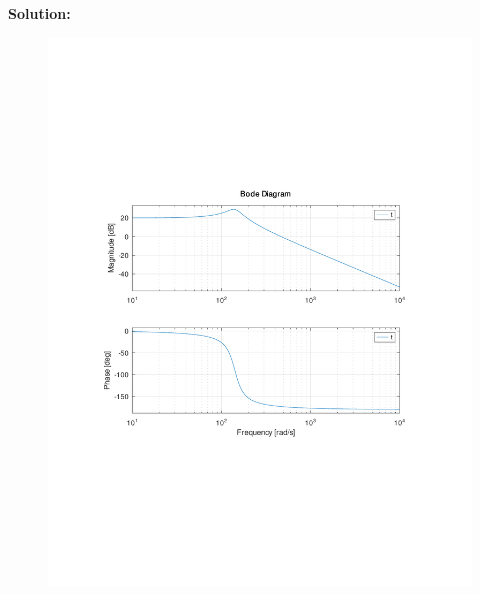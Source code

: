 \begin{enumerate}
            \textbf{Solution:}\\
            \begin{figure}[H]
                \centering
                \includegraphics[width=0.6\linewidth,trim={0 7.5cm 0 7.5cm},clip]{figures/bodeplot.pdf}
            \end{figure}
    \end{enumerate}